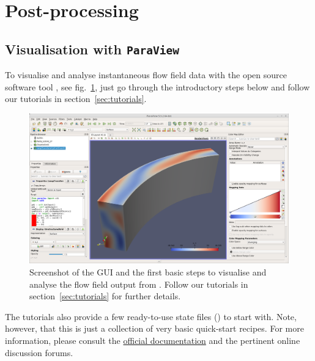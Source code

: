 \documentclass[a4paper, 11pt, DIV=11]{scrartcl}
\begin{document}
\section{Post-processing}

\subsection{Visualisation with \texttt{\textbf{ParaView}}}
\label{sec:paraview}
To visualise and analyse instantaneous flow field data with the open source
software tool , see fig.~\ref{fig:paraViewFlowField}, just go
through the introductory steps below and follow our tutorials in section~\ref{sec:tutorials}.
\begin{figure}[htb]
\includegraphics[width=1.00\linewidth]{figures/paraViewFlowField.png}
\caption{Screenshot of the  GUI and the first basic steps to
visualise and analyse the  flow field output from \nsc. Follow our
tutorials in section~\ref{sec:tutorials} for further details.}
\label{fig:paraViewFlowField}
\end{figure}
The tutorials also provide a few ready-to-use state files ()
to start with. Note, however, that this is just a collection of very
basic quick-start recipes. For more information, please consult the
\href{https://www.paraview.org/Wiki/The_ParaView_Tutorial}{official documentation}
\cite{Moreland2018} and the pertinent online discussion forums.
\end{document}
